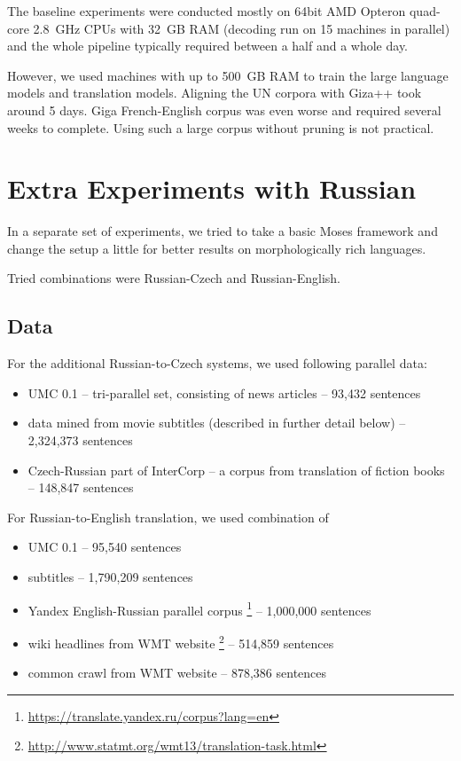 \documentclass[11pt,letterpaper]{article}
\def\parcite#1{\cite{#1}}  %
\def\parcite#1{\cite{#1}}
\begin{document}
The baseline experiments were conducted mostly on 64bit AMD Opteron quad-core 2.8~GHz CPUs with 32~GB RAM
(decoding run on 15 machines in parallel)
and the whole pipeline typically required between a half and a whole day.

However, we used machines with up to 500~GB RAM to train the large language models and translation models.
Aligning the UN corpora with Giza++ took around 5 days.
Giga French-English corpus was even worse and required several weeks to complete.
Using such a large corpus without pruning is not practical.

\section{Extra Experiments with Russian}
In a separate set of experiments, we tried to take a basic Moses framework and change the setup a little for better results on morphologically rich languages.

Tried combinations were Russian-Czech and Russian-English.

\subsection{Data}
For the additional Russian-to-Czech systems, we used following parallel data:

\begin{itemize}
\item UMC 0.1 \parcite{umc} -- tri-parallel set, consisting of news articles -- 93,432 sentences
\item data mined from movie subtitles (described in further detail below) -- 2,324,373 sentences
\item Czech-Russian part of InterCorp -- a corpus from translation of fiction books \parcite{cermak:rosen:10} -- 148,847 sentences
\end{itemize}
For Russian-to-English translation, we used combination of
\begin{itemize}
\item UMC 0.1 -- 95,540 sentences
\item subtitles -- 1,790,209 sentences
\item Yandex English-Russian parallel corpus \footnote{\url{https://translate.yandex.ru/corpus?lang=en}} -- 1,000,000 sentences
\item wiki headlines from WMT website \footnote{\url{http://www.statmt.org/wmt13/translation-task.html}} -- 514,859 sentences
\item common crawl from WMT website -- 878,386 sentences
\end{itemize}
\end{document}
